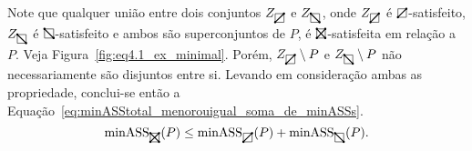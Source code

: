 Note que qualquer união entre dois conjuntos $Z_{\rectpos}$ e $Z_{\rectneg}$, onde $Z_{\rectpos}$ é $\rectpos$-satisfeito, $Z_{\rectneg}$ é $\rectneg$-satisfeito e ambos são superconjuntos de $P$, é $\recttotal$-satisfeita em relação a $P$. Veja Figura~\ref{fig:eq4.1_ex_minimal}. Porém, $Z_{\rectpos} \setminus P$ e $Z_{\rectneg} \setminus P$ não necessariamente são disjuntos entre si. Levando em consideração ambas as propriedade, conclui-se então a Equação~\ref{eq:minASStotal_menorouigual_soma_de_minASSs}.
\begin{equation} \label{eq:minASStotal_menorouigual_soma_de_minASSs}
    \text{minASS}_{\recttotal}(P) \leq \text{minASS}_{\rectpos}(P) + \text{minASS}_{\rectneg}(P).
\end{equation}

